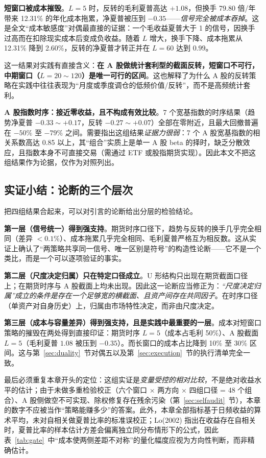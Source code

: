\textbf{短窗口被成本摧毁}。$L=5$ 时，反转的毛利夏普高达 $+1.08$，但换手 79.80 倍/年带来 12.31\% 的年化成本拖累，净夏普被压到 $-0.35$——\emph{信号完全被成本吞掉}。这是全文“成本敏感度”对偶最直接的证据：一个毛收益夏普大于 1 的信号，因换手过高而在扣除现实成本后变成负收益。随着 $L$ 增大，换手下降、成本拖累从 12.31\% 降到 2.60\%，反转的净夏普才转正并在 $L=60$ 达到 $0.99$。

这一结果对实践有直接含义：\textbf{在 A 股做统计套利型的截面反转，短窗口不可行，中期窗口（$L=20\sim120$）是唯一可行的区间}。这也解释了为什么 A 股的反转策略在实践中往往表现为“月度或季度调仓的低频价值/反转”，而不是高频统计套利。

\textbf{A 股指数时序：接近零收益，且不构成有效比较}。7 个宽基指数的时序结果（趋势净夏普 $-0.33\sim+0.17$，反转 $-0.27\sim+0.07$）全部在零附近，且最大回撤普遍在 $-50\%$ 至 $-79\%$ 之间。需要指出这组结果\emph{证据力很弱}：7 个 A 股宽基指数的相关系数高达 0.85 以上，其“组合”实质上是单一 A 股 beta 的择时，缺乏分散效应，且指数本身不可直接交易（需通过 ETF 或股指期货实现）。因此本文不把这组结果作为论据，仅作为对照列出。

\subsection{实证小结：论断的三个层次}

把四组结果合起来，可以对引言的论断给出分层的检验结论。

\textbf{第一层（信号统一）得到强支持}。期货时序口径下，趋势与反转的换手几乎完全相同（差异 $<0.1\%$）、成本拖累几乎完全相同、毛利夏普严格互为相反数。这从实证上确认了“两策略共享同一信号、唯一区别是符号”的构造性论断——它不是一个类比，而是一个可以逐项验证的事实。

\textbf{第二层（尺度决定归属）只在特定口径成立}。U 形结构只出现在期货截面口径上；在期货时序与 A 股截面上均未出现。因此这一论断应当修正为：\emph{“尺度决定归属”成立的条件是存在一个足够宽的横截面、且资产间存在共同因子}。在时序口径（单资产对自身历史）上，归属由市场特性决定，而非由尺度决定。

\textbf{第三层（成本与容量差异）得到强支持，且是实践中最重要的一层}。成本对短窗口策略的摧毁在两处得到直接印证：期货时序 $L=5$（成本占毛利 50\%）、A 股截面 $L=5$（毛利夏普 $1.08$ 被压到 $-0.35$）。而长窗口的成本占比降到 10\% 至 30\% 区间。这与第~\ref{sec:duality}~节对偶五以及第~\ref{sec:execution}~节的执行清单完全一致。

最后必须重复本章开头的定位：这组实证是\emph{变量受控的相对比较}，不是绝对收益水平的估计；由于未做多重检验校正（六个窗口 × 两方向 × 四组口径 = 48 个组合）、A 股侧做空不可实现、除权修复存在残余污染（第~\ref{sec:selfaudit}~节），本章的数字不应被当作“策略能赚多少”的答案。此外，本章全部指标基于日频收益的算术平均，未对自相关做夏普比率的标准误校正；Lo(2002) 指出在收益存在自相关时，夏普比率的样本估计方差会偏离独立同分布情形下的公式\cite{lo2002}，因此表~\ref{tab:gate}~中“成本使两侧差距不对称”的量化幅度应视为方向性判断，而非精确估计。
